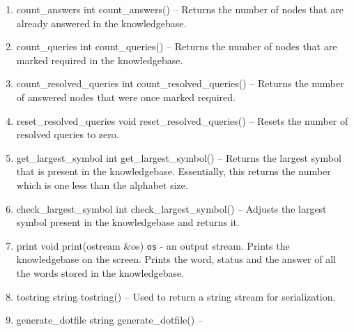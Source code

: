\begin{enumerate}
\begin{detail}
\end{detail}
\item \begin{detail}
{count\_answers}
{int count\_answers()}
{--}
{Returns the number of nodes that are already answered in the knowledgebase.} 
\end{detail}
\item \begin{detail}
{count\_queries}
{int count\_queries()}
{--}
{Returns the number of nodes that are marked required in the knowledgebase.} 
\end{detail}
\item \begin{detail}
{count\_resolved\_queries}
{int count\_resolved\_queries()}
{--}
{Returns the number of answered nodes that were once marked required.} 
\end{detail}
\item \begin{detail}
{reset\_resolved\_queries}
{void reset\_resolved\_queries()}
{--}
{Resets the number of resolved queries to zero.} 
\end{detail}
\item \begin{detail}
{get\_largest\_symbol}
{int get\_largest\_symbol()}
{--}
{Returns the largest symbol that is present in the knowledgebase. Essentially, this returns the number which is one less than the alphabet size.} 
\end{detail}
\item \begin{detail}
{check\_largest\_symbol}
{int check\_largest\_symbol()}
{--}
{Adjusts the largest symbol present in the knowledgebase and returns it.} 
\end{detail}
\item \begin{detail}
{print}
{void print(ostream \&os)}
{\texttt{os} - an output stream.}
{Prints the knowledgebase on the screen. Prints the word, status and the answer of all the words stored in the knowledgebase.} 
\end{detail}
\item \begin{detail}
{tostring}
{string tostring()}
{--}
{Used to return a string stream for serialization.} 
\end{detail}
\item \begin{detail}
{generate\_dotfile}
{string generate\_dotfile()}
{--}

\end{detail}
\end{enumerate}
